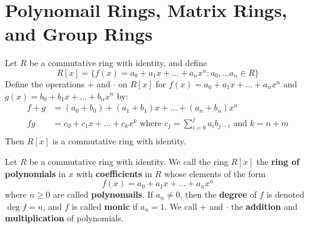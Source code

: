 \section{Polynomail Rings, Matrix Rings, and Group Rings}
\label{section_5.2}

\begin{theorem}\label{theorem_5.2.1}
    Let $R$ be a commutative ring with identity, and define
    \begin{equation*}
      R[x]=\{f(x)=a_0+a_1x+\dots+a_nx^n : a_0, \dots a_n \in R\}
    \end{equation*}
    Define the operations $+$ and  $\cdot$ on $R[x]$ for
    $f(x)=a_0+a_1x+\dots+a_nx^n$ and $g(x)=b_0+b_1x+\dots+b_nx^n$ by:
    \begin{align*}
        f+g &=  (a_0+b_0)+(a_1+b_1)x+\dots+(a_n+b_n)x^n \\
        fg  &=  c_0+c_1x+\dots+c_kx^k \text{ where }
        c_j=\sum_{i=0}^j{a_ib_{j-i}} \text{ and } k=n+m  \\
    \end{align*}
    Then $R[x]$ is a commutative ring with identity.
\end{theorem}

\begin{definition}
    Let $R$ be a commutative ring with identity. We call the ring $R[x]$ the
    \textbf{ring of polynomials} in $x$ with \textbf{coefficients} in $R$ whose
    elements of the form
    \begin{equation*}
        f(x)=a_0+a_1x+\dots+a_nx^n
    \end{equation*}
    where $n \geq 0$ are called \textbf{polynomails}. If $a_n \neq 0$, then the
     \textbf{degree} of $f$ is  denoted $\deg{f}=n$, and $f$ is called
     \textbf{monic} if $a_n=1$. We call $+$ and $\cdot$ the  \textbf{addition}
     and \textbf{multiplication} of polynomials.
\end{definition}

